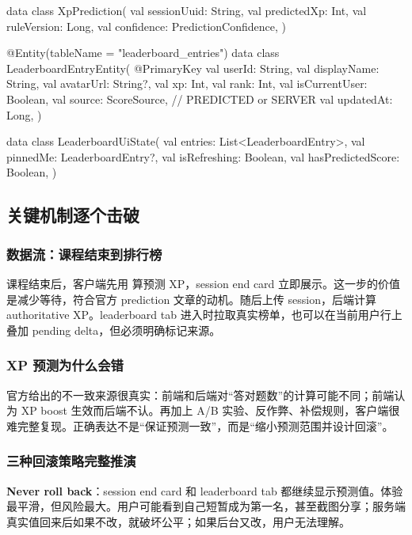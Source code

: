 \begin{kotlin}
data class XpPrediction(
    val sessionUuid: String,
    val predictedXp: Int,
    val ruleVersion: Long,
    val confidence: PredictionConfidence,
)

@Entity(tableName = "leaderboard_entries")
data class LeaderboardEntryEntity(
    @PrimaryKey val userId: String,
    val displayName: String,
    val avatarUrl: String?,
    val xp: Int,
    val rank: Int,
    val isCurrentUser: Boolean,
    val source: ScoreSource, // PREDICTED or SERVER
    val updatedAt: Long,
)

data class LeaderboardUiState(
    val entries: List<LeaderboardEntry>,
    val pinnedMe: LeaderboardEntry?,
    val isRefreshing: Boolean,
    val hasPredictedScore: Boolean,
)
\end{kotlin}

\subsection{关键机制逐个击破}

\subsubsection{数据流：课程结束到排行榜}

课程结束后，客户端先用  算预测 XP，session end card 立即展示。这一步的价值是减少等待，符合官方 prediction 文章的动机。随后上传 session，后端计算 authoritative XP。leaderboard tab 进入时拉取真实榜单，也可以在当前用户行上叠加 pending delta，但必须明确标记来源。

\subsubsection{XP 预测为什么会错}

\srcofficial 官方给出的不一致来源很真实：前端和后端对“答对题数”的计算可能不同；前端认为 XP boost 生效而后端不认。再加上 A/B 实验、反作弊、补偿规则，客户端很难完整复现。正确表达不是“保证预测一致”，而是“缩小预测范围并设计回滚”。

\subsubsection{三种回滚策略完整推演}

\textbf{Never roll back}：session end card 和 leaderboard tab 都继续显示预测值。体验最平滑，但风险最大。用户可能看到自己短暂成为第一名，甚至截图分享；服务端真实值回来后如果不改，就破坏公平；如果后台又改，用户无法理解。

